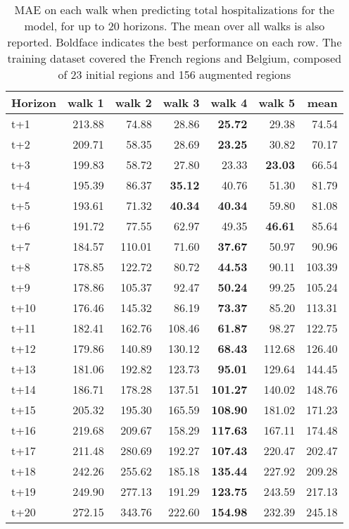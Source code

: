 \begin{table}[H]
\centering
\caption{MAE on each walk when predicting total hospitalizations for the model, for up to 20 horizons. The mean over all walks is also reported. Boldface indicates the best performance on each row. The training dataset covered the French regions and Belgium, composed of 23 initial regions and 156 augmented regions }
\label{tab:MAE_walk_dense_model}
\begin{tabular}{lrrrrrr}
\toprule
Horizon &  walk 1 &  walk 2 &  walk 3 &  walk 4 &  walk 5 &   mean \\
\midrule
t+1  & 213.88  & 74.88  & 28.86  & \textbf{25.72}  & 29.38  & 74.54  \\
t+2  & 209.71  & 58.35  & 28.69  & \textbf{23.25}  & 30.82  & 70.17  \\
t+3  & 199.83  & 58.72  & 27.80  & 23.33  & \textbf{23.03}  & 66.54  \\
t+4  & 195.39  & 86.37  & \textbf{35.12}  & 40.76  & 51.30  & 81.79  \\
t+5  & 193.61  & 71.32  & \textbf{40.34}  & \textbf{40.34}  & 59.80  & 81.08  \\
t+6  & 191.72  & 77.55  & 62.97  & 49.35  & \textbf{46.61}  & 85.64  \\
t+7  & 184.57  & 110.01  & 71.60  & \textbf{37.67}  & 50.97  & 90.96  \\
t+8  & 178.85  & 122.72  & 80.72  & \textbf{44.53}  & 90.11  & 103.39  \\
t+9  & 178.86  & 105.37  & 92.47  & \textbf{50.24}  & 99.25  & 105.24  \\
t+10  & 176.46  & 145.32  & 86.19  & \textbf{73.37}  & 85.20  & 113.31  \\
t+11  & 182.41  & 162.76  & 108.46  & \textbf{61.87}  & 98.27  & 122.75  \\
t+12  & 179.86  & 140.89  & 130.12  & \textbf{68.43}  & 112.68  & 126.40  \\
t+13  & 181.06  & 192.82  & 123.73  & \textbf{95.01}  & 129.64  & 144.45  \\
t+14  & 186.71  & 178.28  & 137.51  & \textbf{101.27}  & 140.02  & 148.76  \\
t+15  & 205.32  & 195.30  & 165.59  & \textbf{108.90}  & 181.02  & 171.23  \\
t+16  & 219.68  & 209.67  & 158.29  & \textbf{117.63}  & 167.11  & 174.48  \\
t+17  & 211.48  & 280.69  & 192.27  & \textbf{107.43}  & 220.47  & 202.47  \\
t+18  & 242.26  & 255.62  & 185.18  & \textbf{135.44}  & 227.92  & 209.28  \\
t+19  & 249.90  & 277.13  & 191.29  & \textbf{123.75}  & 243.59  & 217.13  \\
t+20  & 272.15  & 343.76  & 222.60  & \textbf{154.98}  & 232.39  & 245.18  \\

\bottomrule
\end{tabular}
\end{table}
